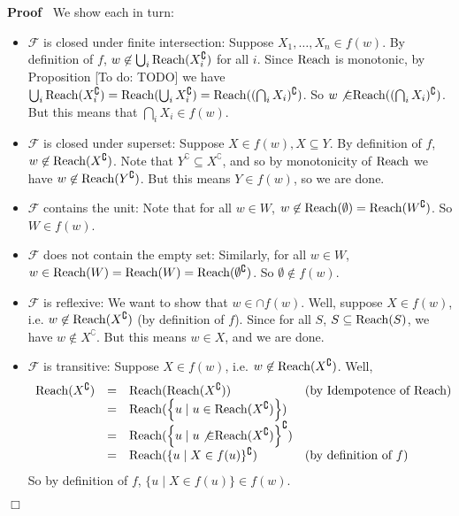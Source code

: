 \documentclass{article}
\newcommand{\nin}{\not\in}
\newcommand{\tmop}[1]{\ensuremath{\operatorname{#1}}}
\newcommand{\todo}[1]{{\color{red!75!black}[To do: #1]}}
\newenvironment{proof}{\noindent\textbf{Proof\ }}{\hspace*{\fill}$\Box$\medskip}
\newcommand{\Reach}{\textsf{\tmop{Reach}}}
\begin{document}
\begin{proof}
  We show each in turn:
  \begin{itemize}
    \item $\mathcal{F}$ is closed under finite intersection: Suppose $X_1,
    \ldots, X_n \in f (w)$. By definition of $f$, $w \nin \bigcup_i \Reach
    (X_i^{\complement})$ for all $i$. Since $\Reach$ is monotonic, by
    Proposition {\todo{TODO}} we have $\bigcup_i \Reach (X_i^{\complement}) =
    \Reach (\bigcup_i X_i^{\complement}) = \Reach ((\bigcap_i
    X_i)^{\complement})$. So $w \not{\in} \Reach ((\bigcap_i
    X_i)^{\complement})$. But this means that $\bigcap_i X_i \in f (w)$.
    
    \item $\mathcal{F}$ is closed under superset: Suppose $X \in f (w), X
    \subseteq Y$. By definition of $f$, $w \nin \Reach (X^{\complement})$.
    Note that $Y^{\complement} \subseteq X^{\complement}$, and so by
    monotonicity of $\Reach$ we have $w \nin \Reach (Y^{\complement})$. But
    this means $Y \in f (w)$, so we are done.
    
    \item $\mathcal{F}$ contains the unit: Note that for all $w \in W$, $w
    \nin \Reach (\emptyset) = \Reach (W^{\complement})$. So $W \in f (w)$.
    
    \item $\mathcal{F}$ does not contain the empty set: Similarly, for all $w
    \in W$, $w \in \Reach (W) = \Reach (W) = \Reach
    (\emptyset^{\complement})$. So $\emptyset \nin f (w)$.
    
    \item $\mathcal{F}$ is reflexive: We want to show that $w \in \cap f (w)$.
    Well, suppose $X \in f (w)$, i.e. $w \nin \Reach (X^{\complement})$ (by
    definition of $f$). Since for all $S$, $S \subseteq \Reach (S)$, we have
    $w \nin X^{\complement}$. But this means $w \in X$, and we are done.
    
    \item $\mathcal{F}$ is transitive: Suppose $X \in f (w)$, i.e. $w \nin
    \Reach (X^{\complement})$. Well,
    \[ \begin{array}{lcll}
         \Reach (X^{\complement}) & = & \Reach (\Reach (X^{\complement})) &
         \textrm{\text{(by Idempotence of }} \Reach)\\
         & = & \Reach (\left\{ u \mid u \in \Reach (X^{\complement})
         \right\}) & \\
         & = & \Reach (\left\{ u \mid u \not{\in} \Reach (X^{\complement})
         \right\}^{\complement}) & \\
         & = & \Reach (\{ u \mid X \in f (u) \}^{\complement}) &
         \textrm{\text{(by definition of }} f)
       \end{array} \]
    So by definition of $f$, $\{ u \mid X \in f (u) \} \in f (w)$.
    

\end{itemize}
\end{proof}
\end{document}
